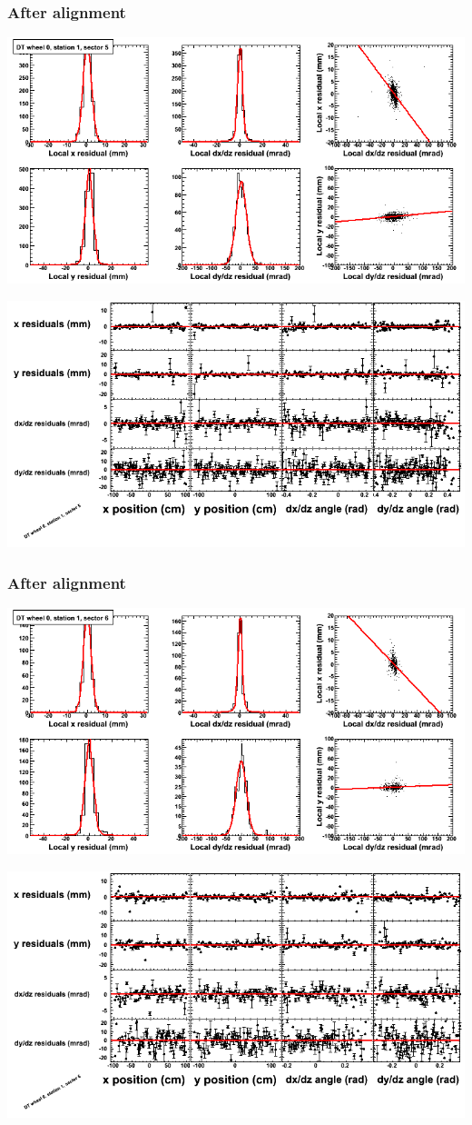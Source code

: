 \documentclass[compress]{beamer}
\begin{document}
\begin{frame}
\frametitle{After alignment}
\includegraphics[width=0.7\linewidth]{NOV4_fitfunctions/MBwhCst1sec05_bellcurves.png}

\includegraphics[width=0.7\linewidth]{NOV4_fitfunctions/MBwhCst1sec05_polynomials.png}
\end{frame}

\begin{frame}
\frametitle{After alignment}
\includegraphics[width=0.7\linewidth]{NOV4_fitfunctions/MBwhCst1sec06_bellcurves.png}

\includegraphics[width=0.7\linewidth]{NOV4_fitfunctions/MBwhCst1sec06_polynomials.png}
\end{frame}
\end{document}
